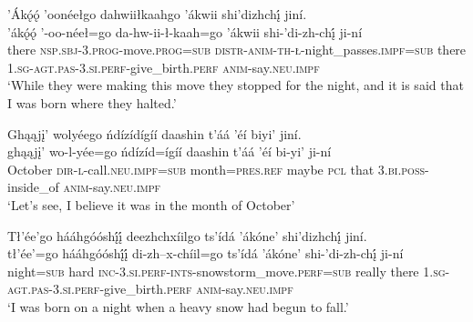 \ea\label{ex:text1-1-4}
’Ákǫ́ǫ́ ’oonéełgo dahwiiłkaahgo ’ákwii shi’dizhchį́ jiní.\\
\gll ’ákǫ́ǫ́	’-oo-néeł=go	da-hw-ii-ł-kaah=go	’ákwii	shi-’di-zh-chį́	ji-ní\\
     there	\textsc{nsp}.\textsc{sbj}-3.\textsc{prog}-move.\textsc{prog}=\textsc{sub}	\textsc{distr}-\textsc{anim}-\textsc{th}-\textsc{ł}-night\_passes.\textsc{impf}=\textsc{sub}	there	1.\textsc{sg}-\textsc{agt}.\textsc{pas}-3.\textsc{si}.\textsc{perf}-give\_birth.\textsc{perf}	\textsc{anim}-say.\textsc{neu}.\textsc{impf}\\
\glt `While they were making this move they stopped for the night, and it is said that I was born where they halted.'
\z

\ea\label{ex:text1-2-1}
Ghąąjį’ wolyéego ńdízídígíí daashin t’áá ’éí biyi’ jiní.\\
\gll ghąąjį’	wo-l-yée=go	ńdízíd=ígíí	daashin	t’áá ’éí	bi-yi’	ji-ní\\
     October	\textsc{dir}-\textsc{l}-call.\textsc{neu}.\textsc{impf}=\textsc{sub}	month=\textsc{pres}.\textsc{ref}	maybe	\textsc{pcl} that	3.\textsc{bi}.\textsc{poss}-inside\_of	\textsc{anim}-say.\textsc{neu}.\textsc{impf}\\
\glt `Let’s see, I believe it was in the month of October'
\z

\ea\label{ex:text1-2-2}
Tł’ée’go hááhgóóshį́į́ deezhchxíilgo ts’ídá ’ákóne’ shi’dizhchį́ jiní.\\
\gll tł’ée’=go	hááhgóóshį́į́	di-zh--x-chíil=go	ts’ídá	’ákóne’	shi-’di-zh-chį́	ji-ní\\
     night=\textsc{sub}	hard	\textsc{inc}-3.\textsc{si}.\textsc{perf}-\textsc{ints}-snowstorm\_move.\textsc{perf}=\textsc{sub}	really	there	1.\textsc{sg}-\textsc{agt}.\textsc{pas}-3.\textsc{si}.\textsc{perf}-give\_birth.\textsc{perf}	\textsc{anim}-say.\textsc{neu}.\textsc{impf}\\
\glt `I was born on a night when a heavy snow had begun to fall.'
\z


